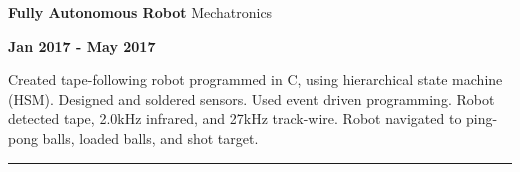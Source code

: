 \documentclass[paper=a4,fontsize=11pt]{article} %
\def \sectionSpace      {0.3cm}    %
\def \subSectionSpace   {0.25cm}     %
\def \leftColSpace      {0.1}       %
\def \middleColSpace    {0.73}       %
\def \bigMiddleColSpace {0.8}       %
\def \rightColSpace     {0.25}      %
\def \lineWidth         {20.25cm}   %
\def \lineThickness     {1pt}     %
\begin{document}
    \vspace{\subSectionSpace}  
    \noindent
    \begin{minipage}[t]{\leftColSpace\linewidth}
        \noindent \hfill
    \end{minipage}
    \begin{minipage}[t]{\middleColSpace\linewidth}
        \noindent \textbf{Fully Autonomous Robot} \quad Mechatronics
    \end{minipage}
    \begin{minipage}[t]{\rightColSpace\linewidth}
        \noindent \textbf{Jan 2017 - May 2017}
    \end{minipage}

    \noindent
    \begin{minipage}[t]{\leftColSpace\linewidth}
        \hfill
    \end{minipage}
    \begin{minipage}[t]{\bigMiddleColSpace\linewidth}
        Created tape-following robot programmed in C, using hierarchical state machine (HSM). Designed and soldered sensors. Used event driven programming. Robot detected tape, 2.0kHz infrared, and 27kHz track-wire. Robot navigated to ping-pong balls, loaded balls, and shot target.
    \end{minipage}

    \vspace{\sectionSpace}
    \noindent\rule{\lineWidth}{\lineThickness}
\end{document}
